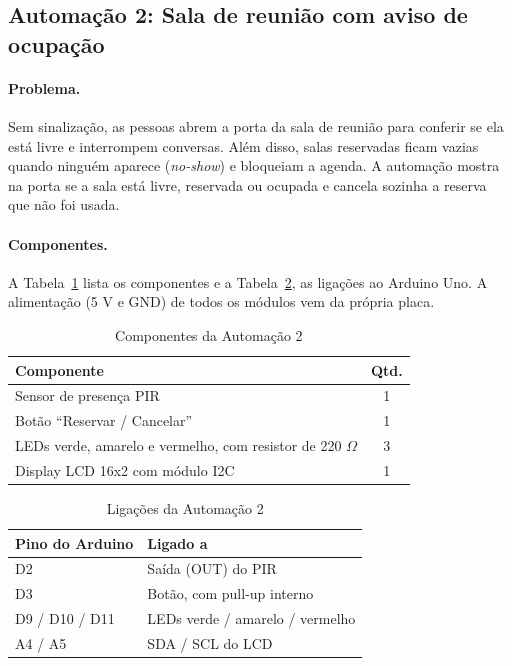 \documentclass[12pt]{article}
\begin{document}
\subsection{Automação 2: Sala de reunião com aviso de ocupação}\label{sub:a2}

\paragraph{Problema.} Sem sinalização, as pessoas abrem a porta da sala de reunião para conferir se ela está livre e interrompem conversas. Além disso, salas reservadas ficam vazias quando ninguém aparece (\emph{no-show}) e bloqueiam a agenda. A automação mostra na porta se a sala está livre, reservada ou ocupada e cancela sozinha a reserva que não foi usada.

\paragraph{Componentes.} A Tabela~\ref{tab:comp2} lista os componentes e a Tabela~\ref{tab:lig2}, as ligações ao Arduino Uno. A alimentação (5 V e GND) de todos os módulos vem da própria placa.

\begin{table}[!htb]
\centering
\caption{Componentes da Automação 2}\label{tab:comp2}
\small
\begin{tabularx}{\textwidth}{Xc}
\toprule
Componente & Qtd. \\
\midrule
Sensor de presença PIR & 1 \\
Botão ``Reservar / Cancelar'' & 1 \\
LEDs verde, amarelo e vermelho, com resistor de 220 $\Omega$ & 3 \\
Display LCD 16x2 com módulo I2C & 1 \\
\bottomrule
\end{tabularx}
\end{table}

\begin{table}[!htb]
\centering
\caption{Ligações da Automação 2}\label{tab:lig2}
\small
\begin{tabularx}{\textwidth}{lX}
\toprule
Pino do Arduino & Ligado a \\
\midrule
D2 & Saída (OUT) do PIR \\
D3 & Botão, com pull-up interno \\
D9 / D10 / D11 & LEDs verde / amarelo / vermelho \\
A4 / A5 & SDA / SCL do LCD \\
\bottomrule
\end{tabularx}
\end{table}
\end{document}
